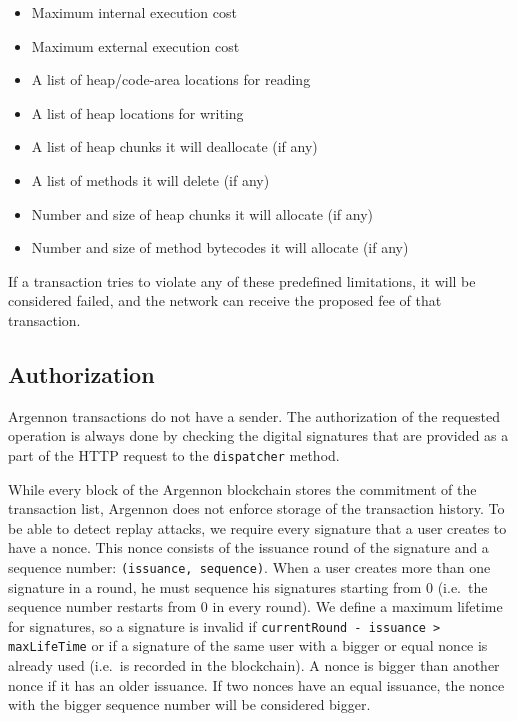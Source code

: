 \begin{itemize}
    \item Maximum internal execution cost
    \item Maximum external execution cost
    \item A list of heap/code-area locations for reading
    \item A list of heap locations for writing
    \item A list of heap chunks it will deallocate (if any)
    \item A list of methods it will delete (if any)
    \item Number and size of heap chunks it will allocate (if any)
    \item Number and size of method bytecodes it will allocate (if any)
\end{itemize}

If a transaction tries to violate any of these predefined limitations, it will be considered failed, and the network
can receive the proposed fee of that transaction.

\subsection{Authorization}\label{subsec:txn-auth}

Argennon transactions do not have a sender. The authorization of the requested operation is always done by checking the
digital signatures that are provided as a part of the HTTP request to the \texttt{dispatcher} method.

While every block of the Argennon blockchain stores the commitment of the transaction list, Argennon does not enforce
storage of the transaction history. To be able to detect replay attacks, we require
every signature that a user creates to have a nonce. This nonce consists of the issuance round of the signature
and a sequence number: \texttt{(issuance,\ sequence)}. When a user creates more than one signature in a round, he
must sequence his signatures starting from 0 (i.e.~the sequence number restarts from 0 in every round). We define
a maximum lifetime for signatures, so a signature is invalid if \texttt{currentRound - issuance > maxLifeTime} or
if a signature of the same user with a bigger or equal nonce is already used
(i.e.~is recorded in the blockchain). A nonce is bigger than another nonce if it has an older issuance. If two
nonces have an equal issuance, the nonce with the bigger sequence number will be considered bigger.

